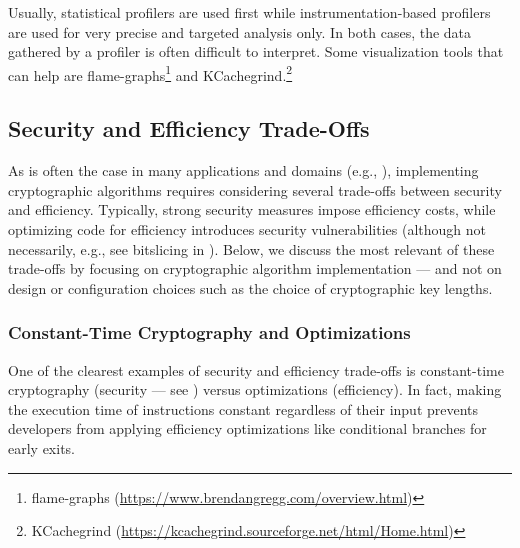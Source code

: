 Usually, statistical profilers are used first while instrumentation-based profilers are used for very precise and targeted analysis only. In both cases, the data gathered by a profiler is often difficult to interpret. Some visualization tools that can help are flame-graphs\footnote{flame-graphs (\url{https://www.brendangregg.com/overview.html})} and KCachegrind.\footnote{KCachegrind (\url{https://kcachegrind.sourceforge.net/html/Home.html})}






\subsection{Security and Efficiency Trade-Offs}\label{sec:security_of_cryptographic_algorithms:trade_offs}




As is often the case in many applications and domains (e.g., \cite{centenaro_safety_2021,berlato_multi_2024}), implementing cryptographic algorithms requires considering several trade-offs between security and efficiency. Typically, strong security measures impose efficiency costs, while optimizing code for efficiency introduces security vulnerabilities (although not necessarily, e.g., see bitslicing in ). Below, we discuss the most relevant of these trade-offs by focusing on cryptographic algorithm implementation --- and not on design or configuration choices such as the choice of cryptographic key lengths.


\subsubsection{Constant-Time Cryptography and Optimizations}\label{sec:security_of_cryptographic_algorithms:trade_offs:constant_time_and_optimization}

One of the clearest examples of security and efficiency trade-offs is constant-time cryptography (security --- see ) versus optimizations (efficiency). In fact, making the execution time of instructions constant regardless of their input prevents developers from applying efficiency optimizations like conditional branches for early exits.


